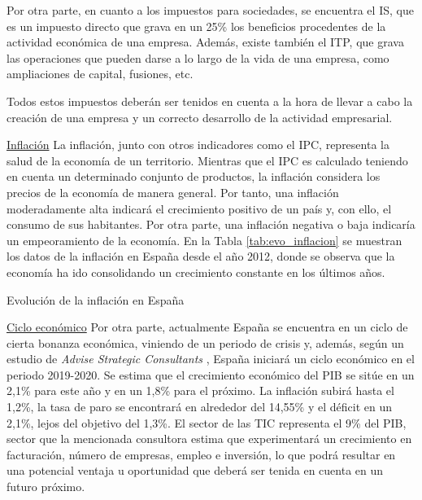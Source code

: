 Por otra parte, en cuanto a los impuestos para sociedades, se encuentra el \acf{IS}, que es un impuesto directo que grava en un 25\% los beneficios procedentes de la actividad económica de una empresa. Además, existe también el \acf{ITP}, que grava las operaciones que pueden darse a lo largo de la vida de una empresa, como ampliaciones de capital, fusiones, etc.

Todos estos impuestos deberán ser tenidos en cuenta a la hora de llevar a cabo la creación de una empresa y un correcto desarrollo de la actividad empresarial.

\noindent\underline{Inflación}\newline
\indent La inflación, junto con otros indicadores como el \acf{IPC}, representa la salud de la economía de un territorio. Mientras que el \acs{IPC} es calculado teniendo en cuenta un determinado conjunto de productos, la inflación considera los precios de la economía de manera general. Por tanto, una inflación moderadamente alta indicará el crecimiento positivo de un país y, con ello, el consumo de sus habitantes. Por otra parte, una inflación negativa o baja indicaría un empeoramiento de la economía. En la Tabla \ref{tab:evo_inflacion} se muestran los datos de la inflación en España desde el año 2012, donde se observa que la economía ha ido consolidando un crecimiento constante en los últimos años.

\begin{table}[!htbp]
	\centering
	{\small
		
	}
	\caption[Evolución de la inflación en España]
	{Evolución de la inflación en España}
	\label{tab:evo_inflacion}
\end{table}

\clearpage

\noindent\underline{Ciclo económico}\newline
\indent Por otra parte, actualmente España se encuentra en un ciclo de cierta bonanza económica, viniendo de un periodo de crisis y, además, según un estudio de \textit{Advise Strategic Consultants} \cite{ituser2019}, España iniciará un ciclo económico en el periodo 2019-2020. Se estima que el crecimiento económico del \acs{PIB} se sitúe en un 2,1\% para este año y en un 1,8\% para el próximo. La inflación subirá hasta el 1,2\%, la tasa de paro se encontrará en alrededor del 14,55\% y el déficit en un 2,1\%, lejos del objetivo del 1,3\%. El sector de las \acs{TIC} representa el 9\% del \acs{PIB}, sector que la mencionada consultora estima que experimentará un crecimiento en facturación, número de empresas, empleo e inversión, lo que podrá resultar en una potencial ventaja u oportunidad que deberá ser tenida en cuenta en un futuro próximo.

